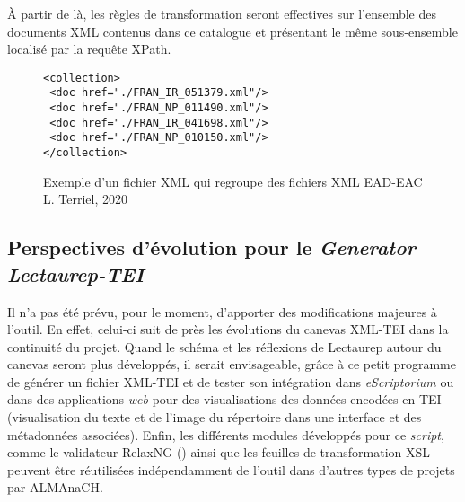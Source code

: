 À partir de là, les règles de transformation seront effectives sur l'ensemble des documents XML contenus dans ce catalogue et présentant le même sous-ensemble localisé par la requête XPath.

\begin{figure}[h!]
\lstset{language=XML}
\begin{lstlisting}
<collection>
 <doc href="./FRAN_IR_051379.xml"/>
 <doc href="./FRAN_NP_011490.xml"/>
 <doc href="./FRAN_IR_041698.xml"/>
 <doc href="./FRAN_NP_010150.xml"/>
</collection>
\end{lstlisting}
\caption{Exemple d'un fichier XML  qui regroupe des fichiers XML EAD-EAC  \textcopyright L. Terriel, 2020}
\label{fig:catalogue}
\end{figure}
\newpage
\subsection{Perspectives d'évolution pour le \textit{Generator Lectaurep-TEI}}

Il n'a pas été prévu, pour le moment, d'apporter des modifications majeures à l'outil. En effet, celui-ci suit de près les évolutions du canevas XML-TEI dans la continuité du projet. Quand le schéma et les réflexions de Lectaurep autour du canevas seront plus développés, il serait envisageable, grâce à ce petit programme de générer un fichier XML-TEI et de tester son intégration dans \textit{eScriptorium} ou dans des applications \textit{web} pour des visualisations des données encodées en TEI (visualisation du texte et de l'image du répertoire dans une interface et des métadonnées associées). Enfin, les différents modules développés pour ce \textit{script}, comme le validateur RelaxNG () ainsi que les feuilles de transformation XSL peuvent être réutilisées indépendamment de l'outil dans d'autres types de projets par ALMAnaCH.
\clearpage
\thispagestyle{empty}